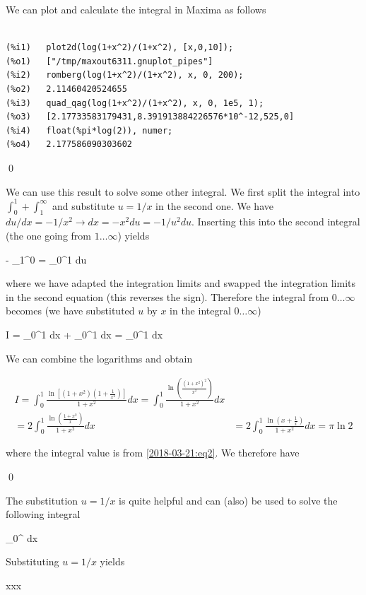 We can plot and calculate the integral in Maxima as follows

\begin{verbatim}

(%i1)	plot2d(log(1+x^2)/(1+x^2), [x,0,10]);
(%o1)	["/tmp/maxout6311.gnuplot_pipes"]
(%i2)	romberg(log(1+x^2)/(1+x^2), x, 0, 200);
(%o2)	2.11460420524655
(%i3)	quad_qag(log(1+x^2)/(1+x^2), x, 0, 1e5, 1);
(%o3)	[2.17733583179431,8.391913884226576*10^-12,525,0]
(%i4)	float(%pi*log(2)), numer;
(%o4)	2.177586090303602

\end{verbatim}

\qed

We can use this result to solve some other integral. We first split the integral into $\int_0^1 + \int_1^\infty$ and substitute $u = 1/x$ in the second one. We have $du/dx=-1/x^2 \rightarrow dx = -x^2 du = -1/u^2 du$. Inserting this into the second integral (the one going from $1\ldots \infty$) yields

\bee
- \int_1^0   = \int_0^1  du
\eee

where we have adapted the integration limits and swapped the integration limits in the second equation (this reverses the sign). Therefore the integral from $0\ldots \infty$ becomes (we have substituted $u$ by $x$ in the integral $0\ldots\infty$)

\bee
I = \int_0^1 dx + \int_0^1 dx = \int_0^1  dx
\eee

We can combine the logarithms and obtain

\begin{align*}
I = \int_0^1 \frac{\ln \left[ (1+x^2) (1+\frac{1}{x^2})\right]}{1+x^2} dx = \int_0^1 \frac{\ln \left( \frac{(1+x^2)^2}{x^2}\right)}{1+x^2} dx & \\ = 2 \int_0^1 \frac{\ln \left( \frac{1+x^2}{x}\right)}{1+x^2} dx & = 2 \int_0^1 \frac{\ln \left( x + \frac{1}{x}\right)}{1+x^2} dx = \pi \ln 2
\end{align*}

where the integral value is from \eqref{2018-03-21:eq2}. We therefore have

\bee
{} \qed
\eee

The substitution $u = 1/x$ is quite helpful and can (also) be used to solve the following integral

\bee
\int_0^\infty {} dx
\eee

Substituting $u = 1/x$ yields

\bee
xxx
\eee